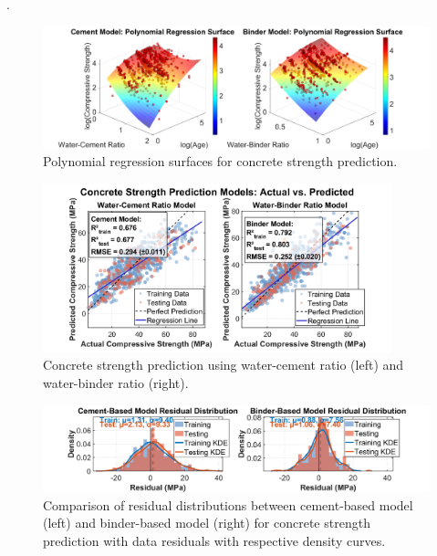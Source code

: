 .\documentclass[a4paper,11pt]{article}
\begin{document}
\vspace{-12pt}
\begin{figure}[htbp]
    \centering
    \includegraphics[width=\textwidth]{photo/polynomial_regression_surface.png}
 \vspace{-21pt}
    \caption{Polynomial regression surfaces for concrete strength prediction.}
    \label{fig:regression_surfaces}
\end{figure}
 \vspace{-21pt}
  \begin{figure}[h!]
    \centering
    \includegraphics[width=0.9\textwidth]{actual_vs_predicted_improved.png}
          \vspace{-15pt}
    \caption{Concrete strength prediction using water-cement ratio (left) and water-binder ratio (right).  }
    \label{fig:actual_vs_predicted}
\end{figure}
\vspace{-20pt}
\begin{figure}[h!]
    \centering
    \includegraphics[width=\textwidth]{photo/poly_residual_plot.png}
   
    \caption{Comparison of residual distributions between cement-based model (left) and binder-based model (right) for concrete strength prediction with data residuals with respective density curves.}
             \vspace{-5pt}
    \label{fig:residual_plot}
    \end{figure}
 
\end{document}

